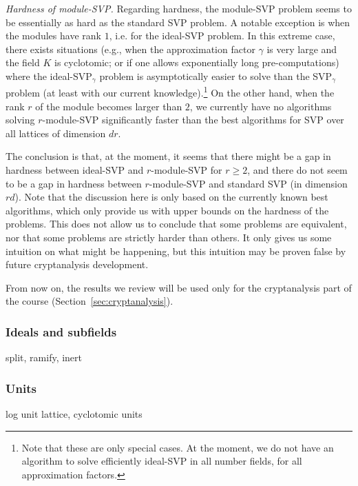 \noindent\textit{Hardness of module-SVP.} Regarding hardness, the module-SVP problem seems to be essentially as hard as the standard SVP problem. A notable exception is when the modules have rank $1$, i.e. for the ideal-SVP problem. In this extreme case, there exists situations (e.g., when the approximation factor $\gamma$ is very large and the field $K$ is cyclotomic; or if one allows exponentially long pre-computations) where the ideal-SVP$_\gamma$ problem is asymptotically easier to solve than the SVP$_\gamma$ problem (at least with our current knowledge).\footnote{Note that these are only special cases. At the moment, we do not have an algorithm to solve efficiently ideal-SVP in all number fields, for all approximation factors.}
On the other hand, when the rank $r$ of the module becomes larger than $2$, we currently have no algorithms solving $r$-module-SVP significantly faster than the best algorithms for SVP over all lattices of dimension $dr$.

The conclusion is that, at the moment, it seems that there might be a gap in hardness between ideal-SVP and $r$-module-SVP for $r \geq 2$, and there do not seem to be a gap in hardness between $r$-module-SVP and standard SVP (in dimension $rd$). Note that the discussion here is only based on the currently known best algorithms, which only provide us with upper bounds on the hardness of the problems. This does not allow us to conclude that some problems are equivalent, nor that some problems are strictly harder than others. It only gives us some intuition on what might be happening, but this intuition may be proven false by future cryptanalysis development.


From now on, the results we review will be used only for the cryptanalysis part of the course (Section~\ref{sec:cryptanalysis}).

\subsubsection{Ideals and subfields}
split, ramify, inert

\subsubsection{Units}
log unit lattice, cyclotomic units



